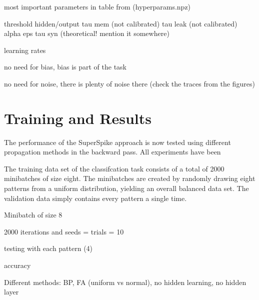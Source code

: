 most important parameters in table from (hyperparams.npz)

threshold hidden/output
tau mem (not calibrated)
tau leak (not calibrated)
alpha 
eps
tau syn (theoretical! mention it somewhere)






learning rates

no need for bias, bias is part of the task

no need for noise, there is plenty of noise there (check the traces from the figures)

\section{Training and Results}

The performance of the SuperSpike approach is now tested using different propagation methods in the backward pass. All experiments have been 



The training data set of the classifcation task consists of a total of 2000 minibatches of size eight. The minibatches are created by randomly drawing eight patterns from a uniform distribution, yielding an overall balanced data set. The validation data simply contains every pattern a single time.

Minibatch of size 8

2000 iterations and seeds = trials = 10

testing with each pattern (4)

accuracy

Different methods: BP, FA (uniform vs normal), no hidden learning, no hidden layer

